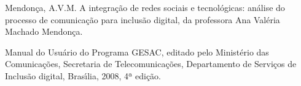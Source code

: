\documentclass[
12pt,		%
openright,	%
twoside,  %
a4paper,			%
chapter=TITLE,		%
english,			%
french,				%
spanish,			%
brazil				%
]{USPSC-classe/USPSC}
\begin{document}
\begin{flushleft}
\begin{flushleft}
\begin{flushleft}
\begin{flushleft}
\begin{flushleft}
\begin{flushleft}
\begin{flushleft}
\begin{flushleft}
\begin{flushleft}
[MENDON\c{C}A, 2015] Mendon\c{c}a, A.V.M. A integra\c{c}\~ao de redes sociais e tecnol\'ogicas: an\'alise do processo de comunica\c{c}\~ao para inclus\~ao digital, da professora Ana Val\'eria  Machado  Mendon\c{c}a.
\end{flushleft}


\end{flushleft}


\end{flushleft}


\end{flushleft}


\end{flushleft}


\end{flushleft}


\end{flushleft}


\end{flushleft}


\end{flushleft}


\begin{flushleft}
\begin{flushleft}
\begin{flushleft}
\begin{flushleft}
\begin{flushleft}
\begin{flushleft}
\begin{flushleft}
\begin{flushleft}
\begin{flushleft}
[MC, 2008] Manual do Usu\'ario do Programa GESAC, editado pelo Minist\'erio das Comunica\c{c}\~oes, Secretaria de Telecomunica\c{c}\~oes, Departamento de Servi\c{c}os de Inclus\~ao digital,  Bras\'{\i}lia, 2008, 4ª edi\c{c}\~ao.
\end{flushleft}


\end{flushleft}


\end{flushleft}


\end{flushleft}


\end{flushleft}


\end{flushleft}


\end{flushleft}


\end{flushleft}


\end{flushleft}
\end{document}
